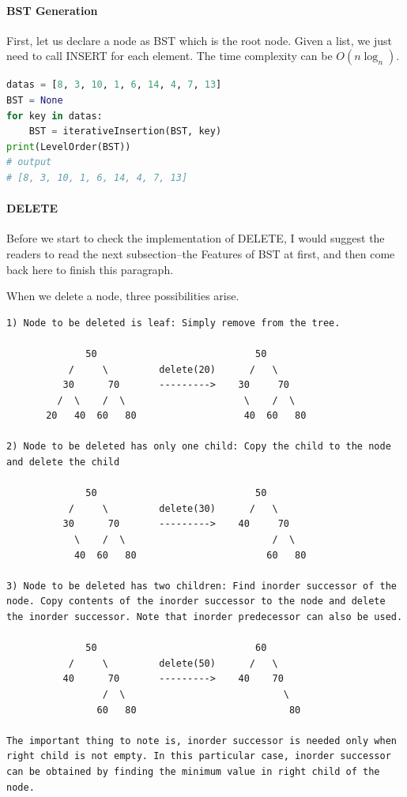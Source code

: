 \documentclass[data-structure.tex]{subfiles}
\begin{document}
\paragraph{BST Generation}
First, let us declare a node as BST which is the root node. Given a list, we just need to call INSERT for each element. The time complexity can be $O(n\log_n)$.
\begin{lstlisting}[language=Python]
datas = [8, 3, 10, 1, 6, 14, 4, 7, 13]
BST = None
for key in datas:
    BST = iterativeInsertion(BST, key)
print(LevelOrder(BST))
# output 
# [8, 3, 10, 1, 6, 14, 4, 7, 13]
\end{lstlisting}
\paragraph{DELETE} 
Before we start to check the implementation of DELETE, I would suggest the readers to read the next subsection--the Features of BST at first, and then come back here to finish this paragraph. 

When we delete a node, three possibilities arise.
\begin{lstlisting}[numbers=none]
1) Node to be deleted is leaf: Simply remove from the tree.

              50                            50
           /     \         delete(20)      /   \
          30      70       --------->    30     70 
         /  \    /  \                     \    /  \ 
       20   40  60   80                   40  60   80

2) Node to be deleted has only one child: Copy the child to the node and delete the child

              50                            50
           /     \         delete(30)      /   \
          30      70       --------->    40     70 
            \    /  \                          /  \ 
            40  60   80                       60   80

3) Node to be deleted has two children: Find inorder successor of the node. Copy contents of the inorder successor to the node and delete the inorder successor. Note that inorder predecessor can also be used.

              50                            60
           /     \         delete(50)      /   \
          40      70       --------->    40    70 
                 /  \                            \ 
                60   80                           80

The important thing to note is, inorder successor is needed only when right child is not empty. In this particular case, inorder successor can be obtained by finding the minimum value in right child of the node.
\end{lstlisting}
\end{document}

